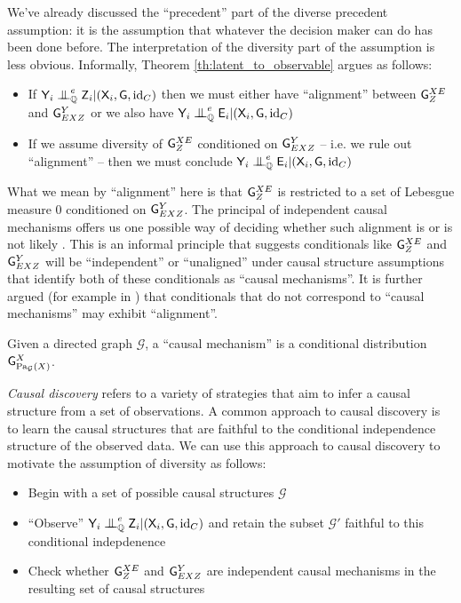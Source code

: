 We've already discussed the ``precedent'' part of the diverse precedent assumption: it is the assumption that whatever the decision maker can do has been done before. The interpretation of the diversity part of the assumption is less obvious. Informally, Theorem \ref{th:latent_to_observable} argues as follows:
\begin{itemize}
	\item If $\RV{Y}_i\CI^e_\prob{Q} \RV{Z}_i |(\RV{X}_i,\RV{G},\mathrm{id}_C)$ then we must either have ``alignment'' between $\mathsf{G}^{XE}_Z$ and $\mathsf{G}^{Y}_{EXZ}$ or we also have $\RV{Y}_i\CI^e_\prob{Q} \RV{E}_i |(\RV{X}_i,\RV{G},\mathrm{id}_C)$
	\item If we assume diversity of $\mathsf{G}^{XE}_Z$ conditioned on $\mathsf{G}^{Y}_{EXZ}$ -- i.e. we rule out ``alignment'' -- then we must conclude $\RV{Y}_i\CI^e_\prob{Q} \RV{E}_i |(\RV{X}_i,\RV{G},\mathrm{id}_C)$
\end{itemize}

What we mean by ``alignment'' here is that $\mathsf{G}^{XE}_Z$ is restricted to a set of Lebesgue measure 0 conditioned on $\mathsf{G}^{Y}_{EXZ}$. The principal of independent causal mechanisms offers us one possible way of deciding whether such alignment is or is not likely \citep{lemeire_replacing_2013,peters_elements_2017}. This is an informal principle that suggests conditionals like $\mathsf{G}^{XE}_Z$ and $\mathsf{G}^{Y}_{EXZ}$ will be ``independent'' or ``unaligned'' under causal structure assumptions that identify both of these conditionals as ``causal mechanisms''. It is further argued (for example in \citet[Ch. ~2]{peters_elements_2017}) that conditionals that do not correspond to ``causal mechanisms'' may exhibit ``alignment''.

Given a directed graph $\mathcal{G}$, a ``causal mechanism'' is a conditional distribution $\mathsf{G}^{X}_{\mathrm{Pa}_{\mathcal{G}}(X)}$.

\emph{Causal discovery} refers to a variety of strategies that aim to infer a causal structure from a set of observations. A common approach to causal discovery is to learn the causal structures that are faithful to the conditional independence structure of the observed data. We can use this approach to causal discovery to motivate the assumption of diversity as follows:
\begin{itemize}
	\item Begin with a set of possible causal structures $\mathscr{G}$
	\item ``Observe'' $\RV{Y}_i\CI^e_\prob{Q} \RV{Z}_i |(\RV{X}_i,\RV{G},\mathrm{id}_C)$ and retain the subset $\mathscr{G}'$ faithful to this conditional indepdenence
	\item Check whether $\mathsf{G}^{XE}_Z$ and $\mathsf{G}^{Y}_{EXZ}$ are independent causal mechanisms in the resulting set of causal structures
\end{itemize}


